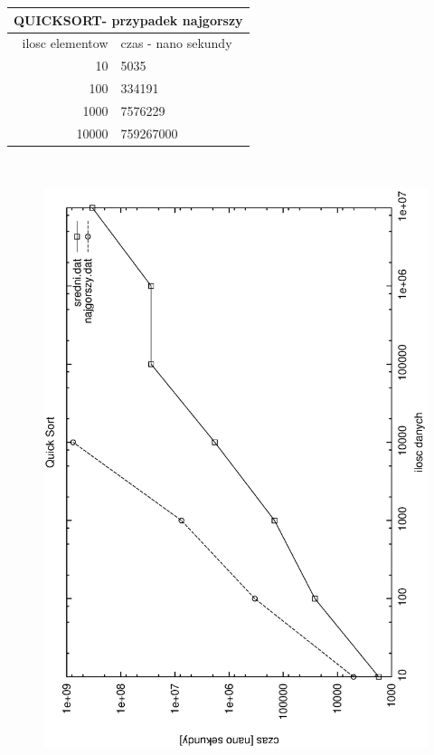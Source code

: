 \documentclass[a4paper,11pt]{report}
\begin{document}
\begin{tabular}{|rl|}
\hline
\multicolumn{2}{|c|}{QUICKSORT- przypadek najgorszy}\\
\hline
ilosc elementow & czas - nano sekundy\\
\hline
10&5035\\
100&334191\\
1000&7576229\\
10000&759267000\\
\hline
\end{tabular}
\\

\begin{figure}
  \begin{center}
    \includegraphics{wykresy/quicksort.eps}
    \caption{}
    \label{fig:}
  \end{center}
\end{figure}
\end{document}
